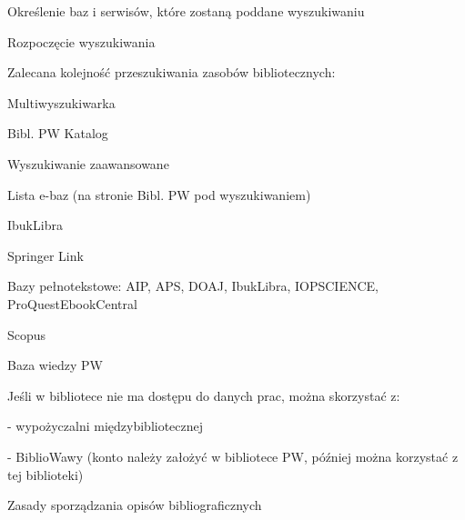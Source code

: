 \documentclass{article}
\begin{document}
Określenie baz i serwisów, które zostaną poddane wyszukiwaniu

Rozpoczęcie wyszukiwania

Zalecana kolejność przeszukiwania zasobów bibliotecznych:

Multiwyszukiwarka

Bibl. PW Katalog

Wyszukiwanie zaawansowane

Lista e-baz (na stronie Bibl. PW pod wyszukiwaniem)

IbukLibra

Springer Link

Bazy pełnotekstowe:
AIP, APS, DOAJ, IbukLibra, IOPSCIENCE, ProQuestEbookCentral

Scopus

Baza wiedzy PW

Jeśli w bibliotece nie ma dostępu do danych prac, można skorzystać z:

- wypożyczalni międzybibliotecznej

- BiblioWawy (konto należy założyć w bibliotece PW, później można korzystać z tej biblioteki)

Zasady sporządzania opisów bibliograficznych
\end{document}
